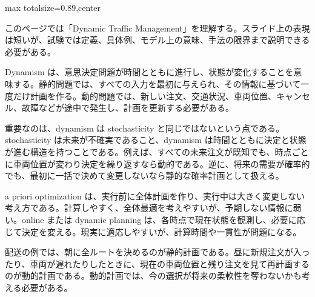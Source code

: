 \begin{minipage}[t]{0.58\textwidth}
\begin{adjustbox}{max totalsize={\textwidth}{0.89\textheight},center}
\begin{minipage}{\textwidth}\scriptsize
{}このページでは「Dynamic Traffic Management」を理解する。スライド上の表現は短いが、試験では定義、具体例、モデル上の意味、手法の限界まで説明できる必要がある。\par
Dynamism は、意思決定問題が時間とともに進行し、状態が変化することを意味する。静的問題では、すべての入力を最初に与えられ、その情報に基づいて一度だけ計画を作る。動的問題では、新しい注文、交通状況、車両位置、キャンセル、故障などが途中で発生し、計画を更新する必要がある。\par
重要なのは、dynamism は stochasticity と同じではないという点である。stochasticity は未来が不確実であること、dynamism は時間とともに決定と状態が進む構造を持つことである。例えば、すべての未来注文が既知でも、時点ごとに車両位置が変わり決定を繰り返すなら動的である。逆に、将来の需要が確率的でも、最初に一括で決めて変更しないなら静的な確率計画として扱える。\par
a priori optimization は、実行前に全体計画を作り、実行中は大きく変更しない考え方である。計算しやすく、全体最適を考えやすいが、予期しない情報に弱い。online または dynamic planning は、各時点で現在状態を観測し、必要に応じて決定を変える。現実に適応しやすいが、計算時間や一貫性が問題になる。\par
配送の例では、朝に全ルートを決めるのが静的計画である。昼に新規注文が入ったり、車両が遅れたりしたときに、現在の車両位置と残り注文を見て再計画するのが動的計画である。動的計画では、今の選択が将来の柔軟性を奪わないかも考える必要がある。\par

\end{minipage}
\end{adjustbox}
\end{minipage}
